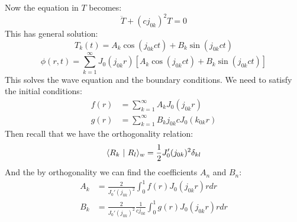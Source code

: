 \documentclass[../Main.tex]{subfiles}
\begin{document}
Now the equation in $T$ becomes:
\begin{equation*}
    \ddot{T} + (cj_{0k})^2 T = 0
\end{equation*}
This has general solution:
\begin{equation*}
    T_k(t) = A_k \cos(j_{0k}ct) + B_k \sin(j_{0k}ct)
\end{equation*}
\begin{equation}
    \phi(r, t) = \sum_{k=1}^{\infty} J_0(j_{0k}r) \left[A_k \cos(j_{0k}ct) + B_k \sin(j_{0k}ct)\right]
    \label{eqnWaveDrumSoln}
\end{equation}
This solves the wave equation and the boundary conditions. We need to satisfy the initial conditions:
\begin{align*}
    f(r) &= \sum_{k=1}^{\infty} A_k J_0(j_{0k}r) \\
    g(r) &= \sum_{k=1}^{\infty} B_k j_{0k} c J_0(k_{0k}r)
\end{align*}
Then recall that we have the orthogonality relation:
\begin{equation*}
    \langle R_k~\vert~R_l\rangle_w = \frac12 J_0'(j_{0k})^2 \delta_{kl}
\end{equation*}
And the by orthogonality we can find the coefficients $A_n$ and $B_n$:
\begin{align*}
    A_k &= \frac{2}{J_0'(j_{0k})^2} \int_{0}^{1} f(r) J_0(j_{0k}r) r dr \\
    B_k &= \frac{2}{J_0'(j_{0k})^2} \frac{1}{cj_{0k}} \int_{0}^{1} g(r) J_0(j_{0k}r)r dr
\end{align*}
\end{document}
